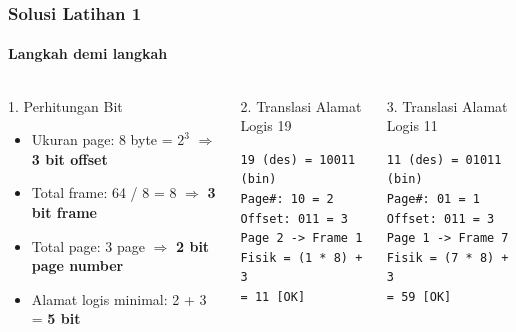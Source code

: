\documentclass[t,aspectratio=169,xcolor=dvipsnames]{beamer}
\begin{document}
\begin{frame}[fragile]
    \frametitle{Solusi Latihan 1}
    \framesubtitle{Langkah demi langkah}
    \scriptsize

    \begin{columns}[T]
        \begin{block}{1. Perhitungan Bit}
            \begin{itemize}
                \item Ukuran page: 8 byte = $2^3$ $\Rightarrow$ \textbf{3 bit offset}
                \item Total frame: 64 / 8 = 8 $\Rightarrow$ \textbf{3 bit frame}
                \item Total page: 3 page $\Rightarrow$ \textbf{2 bit page number}
                \item Alamat logis minimal: 2 + 3 = \textbf{5 bit}
            \end{itemize}
        \end{block}

        \begin{block}{2. Translasi Alamat Logis 19}
            \begin{lstlisting}[basicstyle=\ttfamily\tiny,breaklines=true]
19 (des) = 10011 (bin)
Page#: 10 = 2
Offset: 011 = 3
Page 2 -> Frame 1
Fisik = (1 * 8) + 3
= 11 [OK]
            \end{lstlisting}
        \end{block}

        \vspace{-0.2cm}
        \begin{block}{3. Translasi Alamat Logis 11}
            \begin{lstlisting}[basicstyle=\ttfamily\tiny,breaklines=true]
11 (des) = 01011 (bin)
Page#: 01 = 1
Offset: 011 = 3
Page 1 -> Frame 7
Fisik = (7 * 8) + 3
= 59 [OK]
            \end{lstlisting}
        \end{block}
    \end{columns}
\end{frame}
\end{document}
